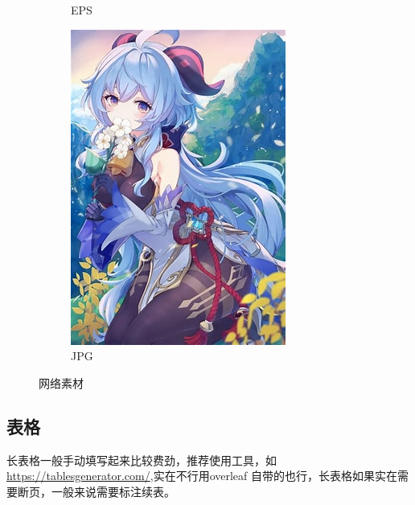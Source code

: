 \begin{figure}[!ht]
\begin{subfigure}[b]{0.32\textwidth}
        \caption{EPS}
    \end{subfigure}
    \begin{subfigure}[b]{0.32\textwidth}
        \includegraphics[width=\textwidth]{figures/float_exp_mihoyo}
        \caption{JPG}
    \end{subfigure}
    \caption{网络素材}
    \label{fig:pic}
\end{figure}

\subsection{表格}

长表格一般手动填写起来比较费劲，推荐使用工具，如\url{https://tablesgenerator.com/},实在不行用overleaf 自带的也行，长表格如果实在需要断页，一般来说需要标注续表。


